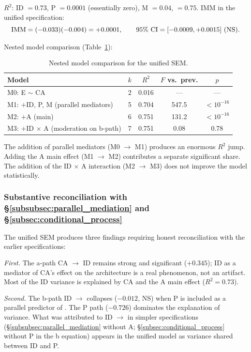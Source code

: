 $R^2$: ID $= 0.73$, P $= 0.0001$ (essentially zero), M $= 0.04$, \EAF{} $= 0.75$. IMM in the unified specification:
\[
\mathrm{IMM} = (-0.033)(-0.004) = +0.0001, \qquad 95\%\ \text{CI} = [-0.0009, +0.0015] \text{ (NS)}.
\]

Nested model comparison (Table~\ref{tab:unified_nested}):

\begin{table}[htbp]
\centering
\caption{Nested model comparison for the unified SEM.}
\label{tab:unified_nested}
\begin{tabular}{lcccc}
\toprule
Model & $k$ & $R^2$ & $F$ vs.\ prev. & $p$ \\
\midrule
M0: E $\sim$ CA & 2 & 0.016 & --- & --- \\
M1: $+$ID, P, M (parallel mediators) & 5 & 0.704 & 547.5 & $<10^{-16}$ \\
M2: $+$A (main) & 6 & 0.751 & 131.2 & $<10^{-16}$ \\
M3: $+$ID $\times$ A (moderation on b-path) & 7 & 0.751 & 0.08 & 0.78 \\
\bottomrule
\end{tabular}
\end{table}

The addition of parallel mediators (M0 $\to$ M1) produces an enormous $R^2$ jump. Adding the A main effect (M1 $\to$ M2) contributes a separate significant share. The addition of the ID $\times$ A interaction (M2 $\to$ M3) does not improve the model statistically.

\subsubsection{\texorpdfstring{Substantive reconciliation with §\ref{subsubsec:parallel_mediation} and §\ref{subsec:conditional_process}}{Substantive reconciliation with parallel mediation and conditional process}}

The unified SEM produces three findings requiring honest reconciliation with the earlier specifications:

\textit{First.} The a-path CA $\to$ ID remains strong and significant ($+0.345$); ID as a mediator of CA's effect on the architecture is a real phenomenon, not an artifact. Most of the ID variance is explained by CA and the A main effect ($R^2 = 0.73$).

\textit{Second.} The b-path ID $\to$ \EAF{} collapses ($-0.012$, NS) when P is included as a parallel predictor of \EAF{}. The P path ($-0.726$) dominates the explanation of \EAF{} variance. What was attributed to ID $\to$ \EAF{} in simpler specifications (§\ref{subsubsec:parallel_mediation} without A; §\ref{subsec:conditional_process} without P in the b equation) appears in the unified model as variance shared between ID and P.

